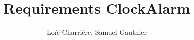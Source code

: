 \documentclass{sgreport}
\begin{document}


\title{Requirements ClockAlarm}
\author{Loïc Charrière, Samuel Gauthier}

\maketitle

\tableofcontents








\printglossaries
\printbibliography
%
\end{document}
